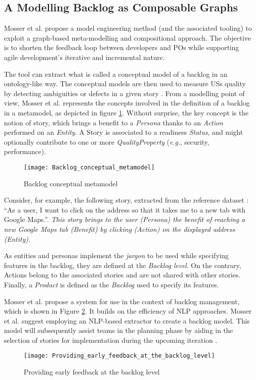 \subsection*{A Modelling Backlog as Composable Graphs} \label{composable_graph}
Mosser et al. propose a model engineering method (and the associated tooling) to exploit a graph-based meta-modelling and compositional approach. The objective is to shorten the feedback loop between developers and POs while supporting agile development’s iterative and incremental nature. 

The tool can extract what is called a conceptual model of a backlog in an ontology-like way. The conceptual models are then used to measure USs quality by detecting ambiguities or defects in a given story \cite{mosser2022modelling}.
From a modelling point of view, Mosser et al. represents the concepts involved in the deﬁnition of a backlog in a metamodel, as depicted in figure \ref{fig:conceptual_metamodel}. Without surprise, the key concept is the notion of story, which brings a benefit to a \emph{Persona} thanks to an \textit{Action} performed on an \emph{Entity}. A Story is associated to a readiness \emph{Status}, and might optionally contribute to one or more \emph{QualityProperty} (\emph{e.g.}, security, performance).
\begin{figure}[h]
\centering
\texttt{[image: Backlog\_conceptual\_metamodel]}
\caption{Backlog conceptual metamodel \cite{mosser2022modelling}}\label{fig:conceptual_metamodel}
\end{figure}

Consider, for example, the following story, extracted from the reference dataset \cite{Dalpiaz2018}: \enquote{As a user, I want to click on the address so that it takes me to a new tab with Google Maps.}. \emph{This story brings to the user (Persona) the benefit of reaching a new Google Maps tab (Benefit) by clicking (Action) on the displayed address (Entity).}

As entities and personas implement the \emph{jargon} to be used while specifying features in the backlog, they are defined at the \emph{Backlog level}. On the contrary, Actions belong to the associated stories and are not shared with other stories. Finally, a \emph{Product} is defined as the \emph{Backlog} used to specify its features.

Mosser et al. propose a system for use in the context of backlog management, which is shown in Figure \ref{fig:early_feedback}. It builds on the efficiency of NLP approaches. Mosser et al. suggest employing an NLP-based extractor to create a backlog model. This model will subsequently assist teams in the planning phase by aiding in the selection of stories for implementation during the upcoming iteration \cite{mosser2022modelling}.
\begin{figure}[h]
\centering
\texttt{[image: Providing\_early\_feedback\_at\_the\_backlog\_level]}
\caption{Providing early feedback at the backlog level \cite{mosser2022modelling}}\label{fig:early_feedback}
\end{figure}
